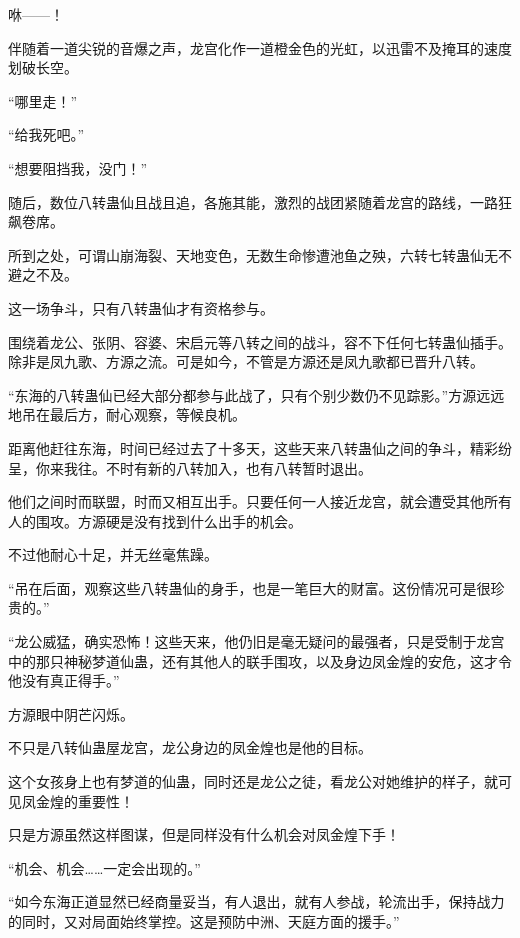 
\begin{this_body}



咻——！

伴随着一道尖锐的音爆之声，龙宫化作一道橙金色的光虹，以迅雷不及掩耳的速度划破长空。

“哪里走！”

“给我死吧。”

“想要阻挡我，没门！”

随后，数位八转蛊仙且战且追，各施其能，激烈的战团紧随着龙宫的路线，一路狂飙卷席。

所到之处，可谓山崩海裂、天地变色，无数生命惨遭池鱼之殃，六转七转蛊仙无不避之不及。

这一场争斗，只有八转蛊仙才有资格参与。

围绕着龙公、张阴、容婆、宋启元等八转之间的战斗，容不下任何七转蛊仙插手。除非是凤九歌、方源之流。可是如今，不管是方源还是凤九歌都已晋升八转。

“东海的八转蛊仙已经大部分都参与此战了，只有个别少数仍不见踪影。”方源远远地吊在最后方，耐心观察，等候良机。

距离他赶往东海，时间已经过去了十多天，这些天来八转蛊仙之间的争斗，精彩纷呈，你来我往。不时有新的八转加入，也有八转暂时退出。

他们之间时而联盟，时而又相互出手。只要任何一人接近龙宫，就会遭受其他所有人的围攻。方源硬是没有找到什么出手的机会。

不过他耐心十足，并无丝毫焦躁。

“吊在后面，观察这些八转蛊仙的身手，也是一笔巨大的财富。这份情况可是很珍贵的。”

“龙公威猛，确实恐怖！这些天来，他仍旧是毫无疑问的最强者，只是受制于龙宫中的那只神秘梦道仙蛊，还有其他人的联手围攻，以及身边凤金煌的安危，这才令他没有真正得手。”

方源眼中阴芒闪烁。

不只是八转仙蛊屋龙宫，龙公身边的凤金煌也是他的目标。

这个女孩身上也有梦道的仙蛊，同时还是龙公之徒，看龙公对她维护的样子，就可见凤金煌的重要性！

只是方源虽然这样图谋，但是同样没有什么机会对凤金煌下手！

“机会、机会……一定会出现的。”

“如今东海正道显然已经商量妥当，有人退出，就有人参战，轮流出手，保持战力的同时，又对局面始终掌控。这是预防中洲、天庭方面的援手。”


\end{this_body}
